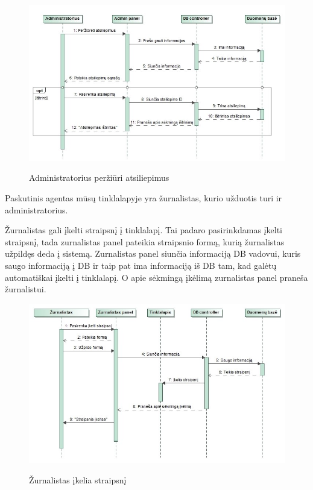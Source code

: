 ﻿\documentclass{VUMIFPSkursinis}
\begin{document}
\begin{figure}[H]
    \centering
    \includegraphics[scale=0.5]{img/Pav/AdminAtsiliepimaiSvetaine}
    \label{img:uml15}
	\caption{Administratorius peržiūri atsiliepimus}
\end{figure}
	
Paskutinis agentas mūsų tinklalapyje yra žurnalistas, kurio užduotis turi ir administratorius.

Žurnalistas gali įkelti straipsnį į tinklalapį. Tai padaro pasirinkdamas įkelti straipsnį, tada zurnalistas panel pateikia straipsnio formą, kurią žurnalistas užpildęs deda į sistemą. Zurnalistas panel siunčia informaciją DB vadovui, kuris saugo informaciją į DB ir taip pat ima informaciją iš DB tam, kad galėtų automatiškai įkelti į tinklalapį. O apie sėkmingą įkėlimą zurnalistas panel praneša žurnalistui.

\begin{figure}[H]
    \centering
    \includegraphics[scale=0.5]{img/Pav/ZurnalistasIkeliaStraipsni}
    \label{img:uml16}
	\caption{Žurnalistas įkelia straipsnį}
\end{figure}
\end{document}
